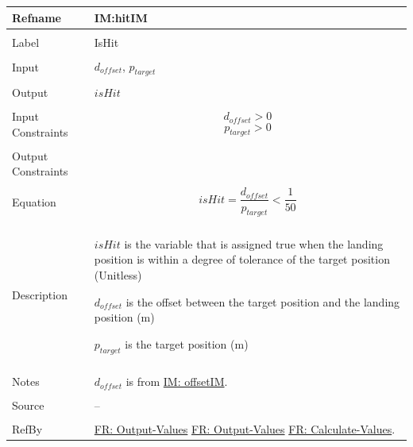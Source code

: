 \documentclass[12pt]{article}
\begin{document}
\noindent \begin{minipage}{\textwidth}
\begin{tabular}{p{} p{}}
\toprule \textbf{Refname} & \textbf{IM:hitIM}
\label{IM:hitIM}
\\ \midrule \\
Label & IsHit
\\ \midrule \\
Input & ${d_{offset}}$, ${p_{target}}$
\\ \midrule \\
Output & $isHit$
\\ \midrule \\
Input Constraints & \begin{displaymath}
                    {d_{offset}}>0
                    \end{displaymath}
                    \begin{displaymath}
                    {p_{target}}>0
                    \end{displaymath}
\\ \midrule \\
Output Constraints & 
\\ \midrule \\
Equation & \begin{displaymath}
           isHit=\frac{{d_{offset}}}{{p_{target}}}<\frac{1}{50}
           \end{displaymath}
\\ \midrule \\
Description & \begin{symbDescription}
              \item{$isHit$ is the variable that is assigned true when the landing position is within a degree of tolerance of the target position (Unitless)}
              \item{${d_{offset}}$ is the offset between the target position and the landing position (m)}
              \item{${p_{target}}$ is the target position (m)}
              \end{symbDescription}
\\ \midrule \\
Notes & ${d_{offset}}$ is from \hyperref[IM:offsetIM]{IM: offsetIM}.
\\ \midrule \\
Source & --
\\ \midrule \\
RefBy & \hyperref[outputValues]{FR: Output-Values} \hyperref[outputValues]{FR: Output-Values} \hyperref[calcValues]{FR: Calculate-Values}.
\\ \bottomrule \end{tabular}
\end{minipage}
\end{document}
